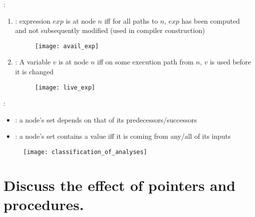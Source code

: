  :
\begin{enumerate}
    \item {} : expression $exp$ is  at node $n$ iff for all paths to $n$, $exp$ has been computed and not subsequently modified (used in compiler construction)
    \begin{figure}[H]
        \centering
        \texttt{[image: avail\_exp]}
    \end{figure}
    \item {} : A variable $v$ is  at node $n$ iff on some execution path from $n$, $v$ is used before it is changed
    \begin{figure}[H]
        \centering
        \texttt{[image: live\_exp]}
    \end{figure}
\end{enumerate}

 :
\begin{itemize}
    \item {} : a node’s set depends on that of its predecessors/successors
    \item {} : a node’s set contains a value iff it is coming from any/all of its inputs
\end{itemize}

\begin{figure}[H]
    \centering
    \texttt{[image: classification\_of\_analyses]}
\end{figure}

\section{Discuss the effect of pointers and procedures.}

